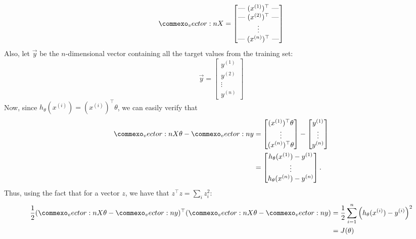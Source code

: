 \begin{equation}
    \mat X = \begin{bmatrix}
        \text{--- } (x^{(1)})^\top \text{ ---} \\
        \text{--- } (x^{(2)})^\top \text{ ---} \\
        \vdots \\
        \text{--- } (x^{(n)})^\top \text{ ---}
    \end{bmatrix}
\end{equation}
Also, let $\vec y$ be the $n$-dimensional vector containing all the target values from
the training set:
\begin{equation}
    \vec y = \begin{bmatrix}
        y^{(1)} \\
        y^{(2)} \\
        \vdots \\
        y^{(n)}
    \end{bmatrix}
\end{equation}
Now, since $h_\theta(x^{(i)}) = (x^{(i)})^\top \theta$, we can easily verify that
\begin{align*}
    \mat X \theta - \vec y &= \begin{bmatrix}
        (x^{(1)})^\top \theta \\
        \vdots \\
        (x^{(n)})^\top \theta
    \end{bmatrix}
    -
    \begin{bmatrix}
        y^{(1)} \\    
        \vdots \\
        y^{(n)}    
    \end{bmatrix}\\
    &= \begin{bmatrix}
        h_\theta(x^{(1)}) - y^{(1)} \\
        \vdots \\
        h_\theta(x^{(n)}) - y^{(n)}
    \end{bmatrix}\text{.}
\end{align*}
Thus, using the fact that for a vector $z$, we have that $z^\top z = \sum_i z_i^2$:
\begin{align*}
    \frac 1 2 (\mat X \theta - \vec y)^\top (\mat X \theta - \vec y) &= \frac 1 2 \sum_{i=1}^n \left( h_\theta(x^{(i)}) - y^{(i)} \right)^2 \\
    &= J(\theta)
\end{align*}
